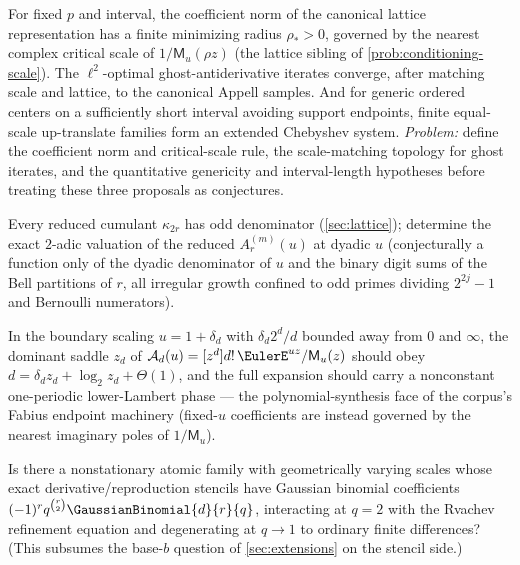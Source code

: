 \documentclass[11pt,oneside]{article}
\numberwithin{equation}{section}
\theoremstyle{definition}
\theoremstyle{remark}
\newcommand{\MM}{\mathsf M}
\newcommand{\Gd}{\mathcal A}
\begin{document}
\begin{problem}
\label{prob:lattice-analytic}
For fixed $p$ and interval, the coefficient norm of the canonical
lattice representation has a finite minimizing radius $\rho_*>0$,
governed by the nearest complex critical scale of
$1/\MM_u(\rho z)$ (the lattice sibling of
\cref{prob:conditioning-scale}).  The $\ell^{2}$-optimal
ghost-antiderivative iterates converge, after matching scale and
lattice, to the canonical Appell samples.  And for generic ordered
centers on a sufficiently short interval avoiding support endpoints,
finite equal-scale up-translate families form an extended Chebyshev
system.
\emph{Problem:} define the coefficient norm and critical-scale rule, the
scale-matching topology for ghost iterates, and the quantitative genericity
and interval-length hypotheses before treating these three proposals as
conjectures.
\end{problem}

\begin{question}
\label{q:odd-denominator}
Every reduced cumulant $\kappa_{2r}$ has odd denominator
(\cref{sec:lattice}); determine the exact $2$-adic valuation of the
reduced $A^{(m)}_r(u)$ at dyadic $u$ (conjecturally a function only
of the dyadic denominator of $u$ and the binary digit sums of the
Bell partitions of $r$, all irregular growth confined to odd primes
dividing $2^{2j}-1$ and Bernoulli numerators).
\end{question}

\begin{question}
\label{q:appell-endpoint}
In the boundary scaling $u=1+\delta_d$ with
$\delta_d2^{d}/d$ bounded away from $0$ and $\infty$, the dominant
saddle $z_d$ of $\Gd_d(u)=[z^{d}]d!\,\EulerE^{uz}/\MM_u(z)$ should obey
$d=\delta_dz_d+\log_2z_d+\Theta(1)$, and the full expansion should
carry a nonconstant one-periodic lower-Lambert phase --- the
polynomial-synthesis face of the corpus's Fabius endpoint machinery
(fixed-$u$ coefficients are instead governed by the nearest
imaginary poles of $1/\MM_u$).
\end{question}

\begin{question}
\label{q:qgeometric}
Is there a nonstationary atomic family with geometrically varying
scales whose exact derivative/reproduction stencils have Gaussian
binomial coefficients $(-1)^{r}q^{\binom r2}
\GaussianBinomial{d}{r}{q}$, interacting at $q=2$ with the
Rvachev refinement equation and degenerating at $q\to1$ to ordinary
finite differences?  (This subsumes the base-$b$ question of
\cref{sec:extensions} on the stencil side.)
\end{question}
\end{document}

